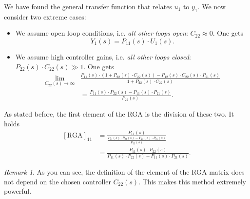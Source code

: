 \documentclass[a4paper,12 pt]{article}
\numberwithin{equation}{section}
\theoremstyle{definition}
\theoremstyle{remark}
\newtheorem*{bmk}{Remark}
\theoremstyle{definition}
\theoremstyle{definition}
\theoremstyle{definition}
\theoremstyle{remark}
\begin{document}
We have found the general transfer function that relates $u_1$ to $y_1$. We now consider two extreme cases:
\begin{itemize}
\item We assume open loop conditions, i.e. \textit{all other loops open}: $C_{22}\approx 0$. One gets
\begin{equation}
Y_1(s)=P_{11}(s)\cdot U_1(s).
\end{equation}
\item We assume high controller gains, i.e. \textit{all other loops closed}: $P_{22}(s)\cdot C_{22}(s) \gg 1$. One gets
\begin{equation}
\begin{split}
\lim_{C_{22}(s)\rightarrow \infty} & \frac{P_{11}(s)\cdot (1+P_{22}(s)\cdot C_{22}(s))-P_{12}(s)\cdot C_{22}(s)\cdot P_{21}(s)}{1+P_{22}(s)\cdot C_{22}(s)}\\
&=\frac{P_{11}(s)\cdot P_{22}(s)-P_{11}(s)\cdot P_{21}(s)}{P_{22}(s)}.
\end{split}
\end{equation}
\end{itemize}
As stated before, the first element of the RGA is the division of these two. It holds
\begin{equation}
\begin{split}
[\text{RGA}]_{11}&=\frac{P_{11}(s)}{\frac{P_{11}(s)\cdot P_{22}(s)-P_{11}(s)\cdot P_{21}(s)}{P_{22}(s)}}\\
&=\frac{P_{11}(s)\cdot P_{22}(s)}{P_{11}(s)\cdot P_{22}(s)-P_{11}(s)\cdot P_{21}(s)}.
\end{split}
\end{equation}
\begin{bmk}
As you can see, the definition of the element of the RGA matrix does not depend on the chosen controller $C_{22}(s)$. This makes this method extremely powerful.
\end{bmk}
\end{document}
